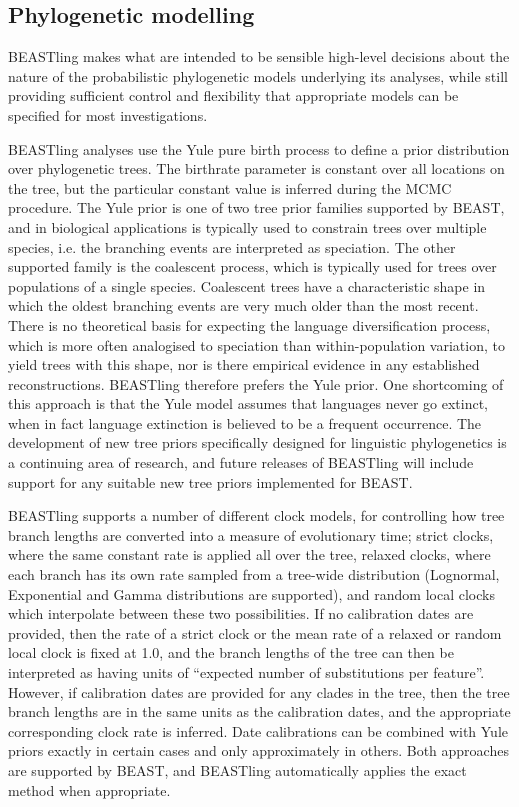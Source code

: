 \documentclass[twocolumn,10pt]{scrartcl}
\begin{document}
\subsection{Phylogenetic modelling}

BEASTling makes what are intended to be sensible high-level decisions about the nature of the probabilistic phylogenetic models underlying its analyses, while still providing sufficient control and flexibility that appropriate models can be specified for most investigations.

BEASTling analyses use the Yule pure birth process to define a prior distribution over phylogenetic trees.  The birthrate parameter is constant over all locations on the tree, but the particular constant value is inferred during the MCMC procedure.  The Yule prior is one of two tree prior families supported by BEAST, and in biological applications is typically used to constrain trees over multiple species, i.e. the branching events are interpreted as speciation.  The other supported family is the coalescent process, which is typically used for trees over populations of a single species.  Coalescent trees have a characteristic shape in which the oldest branching events are very much older than the most recent.  There is no theoretical basis for expecting the language diversification process, which is more often analogised to speciation than within-population variation, to yield trees with this shape, nor is there empirical evidence in any established reconstructions.  BEASTling therefore prefers the Yule prior.  One shortcoming of this approach is that the Yule model assumes that languages never go extinct, when in fact language extinction is believed to be a frequent occurrence.  The development of new tree priors specifically designed for linguistic phylogenetics is a continuing area of research, and future releases of BEASTling will include support for any suitable new tree priors implemented for BEAST.

BEASTling supports a number of different clock models, for controlling how tree branch lengths are converted into a measure of evolutionary time; strict clocks, where the same constant rate is applied all over the tree, relaxed clocks\cite{Drummond2006}, where each branch has its own rate sampled from a tree-wide distribution (Lognormal, Exponential and Gamma distributions are supported), and random local clocks\cite{Drummond2010} which interpolate between these two possibilities.  If no calibration dates are provided, then the rate of a strict clock or the mean rate of a relaxed or random local clock is fixed at 1.0, and the branch lengths of the tree can then be interpreted as having units of ``expected number of substitutions per feature''.  However, if calibration dates are provided for any clades in the tree, then the tree branch lengths are in the same units as the calibration dates, and the appropriate corresponding clock rate is inferred.  Date calibrations can be combined with Yule priors exactly in certain cases\cite{Heled2011} and only approximately in others.  Both approaches are supported by BEAST, and BEASTling automatically applies the exact method when appropriate.
\end{document}
